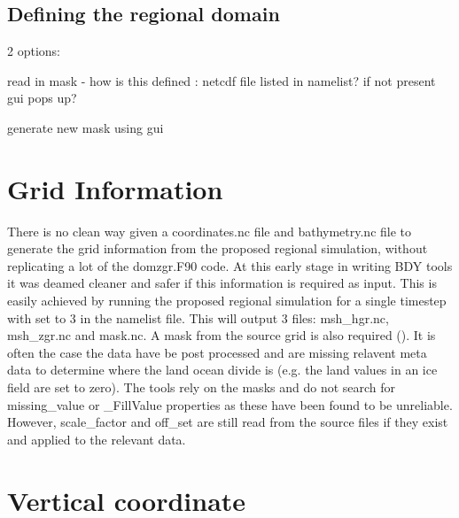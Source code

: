 \subsection{Defining the regional domain}
\label{domain}

2 options:

read in mask - how is this defined : netcdf file listed in namelist? if not present gui pops up?

generate new mask using gui


\section{Grid Information}
\label{s_coord}

There is no clean way given a coordinates.nc file and bathymetry.nc file to generate the grid information
from the proposed regional simulation, without replicating a lot of the domzgr.F90  code. At this early stage
in writing BDY tools it was deamed cleaner and safer if this information is required as input. This is easily 
achieved by running the proposed regional simulation for a single timestep with  set to 3 in the 
\NEMO namelist file. This will output 3 files: msh\_hgr.nc, msh\_zgr.nc and mask.nc.
A mask from the source grid is also required (). It is often the case the data have
be post processed and are missing relavent meta data to determine where the land ocean divide 
is (e.g. the land values in an ice field are set to zero). The tools rely on the masks and do not 
search for missing\_value or \_FillValue properties as these have been found to be unreliable. 
However, scale\_factor and off\_set are still read from the source files if they exist and applied to
the relevant data.

\section{Vertical coordinate}
\label{vert_coord}




